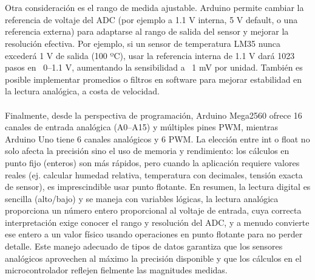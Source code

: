 \\\\
Otra consideración es el rango de medida ajustable. Arduino permite cambiar la referencia de voltaje del ADC (por ejemplo a 1.1 V interna, 5 V default, o una referencia externa) para adaptarse al rango de salida del sensor y mejorar la resolución efectiva. Por ejemplo, si un sensor de temperatura LM35 nunca excederá 1 V de salida (100 ºC), usar la referencia interna de 1.1 V dará 1023 pasos en ~0–1.1 V, aumentando la sensibilidad a ~1 mV por unidad. También es posible implementar promedios o filtros en software para mejorar estabilidad en la lectura analógica, a costa de velocidad. 
\\\\
Finalmente, desde la perspectiva de programación, Arduino Mega2560 ofrece 16 canales de entrada analógica (A0–A15) y múltiples pines PWM, mientras Arduino Uno tiene 6 canales analógicos y 6 PWM. La elección entre int o float no solo afecta la precisión sino el uso de memoria y rendimiento: los cálculos en punto fijo (enteros) son más rápidos, pero cuando la aplicación requiere valores reales (ej. calcular humedad relativa, temperatura con decimales, tensión exacta de sensor), es imprescindible usar punto flotante. En resumen, la lectura digital es sencilla (alto/bajo) y se maneja con variables lógicas, la lectura analógica proporciona un número entero proporcional al voltaje de entrada, cuya correcta interpretación exige conocer el rango y resolución del ADC, y a menudo convierte ese entero a un valor físico usando operaciones en punto flotante para no perder detalle. Este manejo adecuado de tipos de datos garantiza que los sensores analógicos aprovechen al máximo la precisión disponible y que los cálculos en el microcontrolador reflejen fielmente las magnitudes medidas.